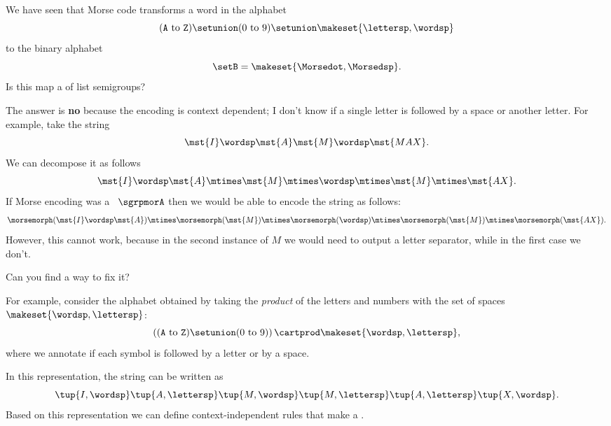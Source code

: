 \begin{exercise}
    We have seen that Morse code transforms a word in the alphabet
    \begin{equation}
        (\texttt{A} \ \text{to}\ \texttt{Z})
        \setunion (0 \ \text{to}\ 9) \setunion \makeset{\lettersp, \wordsp}
    \end{equation}
    to the binary alphabet
    \begin{equation}
        \setB = \makeset{\Morsedot, \Morsedsp}.
    \end{equation}
    Is this map a \whomo of list semigroups?
\end{exercise}
%
\begin{solution}
    The answer is \textbf{no} because the encoding is context dependent; I don't know if a single letter is followed by a space or another letter.
    For example, take the string
    \begin{equation}
        \label{eq:max-iammax}
        \mst {I} \wordsp \mst{A} \mst{M}\wordsp \mst{MAX}.
    \end{equation}
    We can decompose it as follows
    \begin{equation}
        \label{eq:max-iammax-decomp}
        \mst{I}\wordsp \mst{A}\mtimes \mst{M} \mtimes \wordsp \mtimes \mst{M} \mtimes \mst{AX}.
    \end{equation}
    If Morse encoding was a \whomo~$\sgrpmorA$ then we would be able to encode the string as follows:
    \begin{equation}
        \label{eq:max-iammax-decomp-morph}
        \morsemorph(\mst{I}\wordsp \mst{A}) \mtimes \morsemorph (\mst{M}) \mtimes  \morsemorph(\wordsp) \mtimes  \morsemorph(\mst{M})
        \mtimes  \morsemorph(\mst{AX}).
    \end{equation}
    However, this cannot work, because in the second instance of $M$ we would need to output a letter separator, while in the first case we don't.

    Can you find a way to fix it?

    For example, consider the alphabet obtained by taking the \emph{product} of the letters and numbers with the set of spaces~$\makeset{\wordsp, \lettersp}$:
    \begin{equation}
        \left( (\texttt{A} \ \text{to}\ \texttt{Z}) \setunion (0 \ \text{to}\ 9) \right) \cartprod \makeset{\wordsp, \lettersp},
    \end{equation}
    where we annotate if each symbol is followed by a letter or by a space.

    In this representation, the string can be written as
    \begin{equation}
        \tup{I, \wordsp} \tup{A, \lettersp} \tup{ M, \wordsp} \tup{M, \lettersp} \tup{A, \lettersp}
        \tup{X, \wordsp}.
    \end{equation}
    Based on this representation we can define context-independent rules that make a \whomo.
\end{solution}

